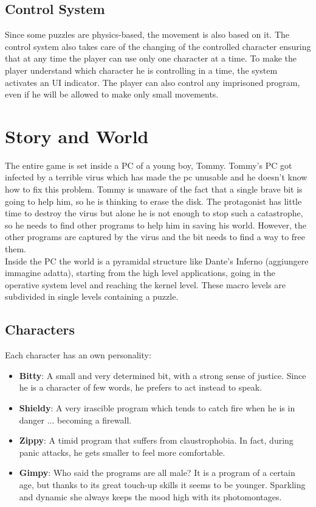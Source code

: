 \documentclass[12pt, a4paper]{report}
\begin{document}
\section*{Control System}
Since some puzzles are physics-based, the movement is also based on it. The control system also takes care of the changing of the controlled character ensuring that at any time the player can use only one character at a time. To make the player understand which character he is controlling in a time, the system activates an UI indicator. The player can also control any imprisoned program, even if he will be allowed to make only small movements.



\chapter{Story and World}
The entire game is set inside a PC of a young boy, Tommy. Tommy’s PC got infected by a terrible virus which has made the pc unusable and he doesn’t know how to fix this problem. Tommy is unaware of the fact that a single brave bit is going to help him, so he is thinking to erase the disk. The protagonist has little time to destroy the virus but alone he is not enough to stop such a catastrophe, so he needs to find other programs to help him in saving his world. However, the other programs are captured by the virus and the bit needs to find a way to free them.\\
Inside the PC the world is a pyramidal structure like Dante’s Inferno (aggiungere immagine adatta), starting from the high level applications, going in the operative system level and reaching the kernel level. These macro levels are subdivided in single levels containing a puzzle.

\section*{Characters}
Each character has an own personality:
\begin{itemize}
\item \textbf{Bitty}: A small and very determined bit, with a strong sense of justice. Since he is a character of few words, he prefers to act instead to speak.
\item \textbf{Shieldy}: A very irascible program which tends to catch fire when he is in danger ... becoming a firewall.
\item \textbf{Zippy}: A timid program that suffers from claustrophobia. In fact, during panic attacks, he gets smaller to feel more comfortable.
\item \textbf{Gimpy}: Who said the programs are all male? It is a program of a certain age, but thanks to its great touch-up skills it seems to be younger. Sparkling and dynamic she always keeps the mood high with its photomontages.
\end{itemize}
\end{document}

